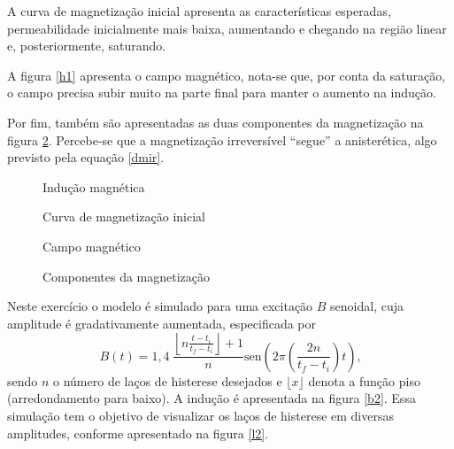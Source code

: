 \documentclass{homeworg}
\begin{document}
\hspace{1cm} A curva de magnetização inicial apresenta as características esperadas, permeabilidade inicialmente mais baixa, aumentando e chegando na região linear e, posteriormente, saturando.

\hspace{1cm} A figura \ref{h1} apresenta o campo magnético, nota-se que, por conta da saturação, o campo precisa subir muito na parte final para manter o aumento na indução.

\hspace{1cm} Por fim, também são apresentadas as duas componentes da magnetização na figura \ref{c1}. Percebe-se que a magnetização irreversível ``segue'' a anisterética, algo previsto pela equação \ref{dmir}.

\begin{figure}[!h]
  \begin{minipage}{.49\linewidth}
    \centering
    
    \vspace{-.5cm}
    \caption{Indução magnética}
    \label{b1}
  \end{minipage}%
  \begin{minipage}{.49\linewidth}
    \centering
    
    \vspace{-.5cm}
    \caption{Curva de magnetização inicial}
    \label{l1}
  \end{minipage}
\end{figure}
\begin{figure}[!h]
  \begin{minipage}{.49\linewidth}
    \centering
    
    \vspace{-.5cm}
    \caption{Campo magnético}
    \label{h1}
  \end{minipage}%
  \begin{minipage}{.49\linewidth}
    \centering
    
    \vspace{-.5cm}
    \caption{Componentes da magnetização}
    \label{c1}
  \end{minipage}%
\end{figure}

\exercise

\hspace{1cm} Neste exercício o modelo é simulado para uma excitação $B$ senoidal, cuja amplitude é gradativamente aumentada, especificada por
\begin{equation}
  B(t) = 1,4~\frac{\left\lfloor\displaystyle n\frac{\displaystyle t-t_i}{\displaystyle t_f-t_i}\right\rfloor + 1}{n}\mathrm{sen}\left(2\pi \left(\frac{2n}{t_f-t_i}\right) t\right) \text{,}
\end{equation}
sendo $n$ o número de laços de histerese desejados e $\lfloor x \rfloor$ denota a função piso (arredondamento para baixo). A indução é apresentada na figura \ref{b2}. Essa simulação tem o objetivo de visualizar os laços de histerese em diversas amplitudes, conforme apresentado na figura \ref{l2}.
\end{document}
